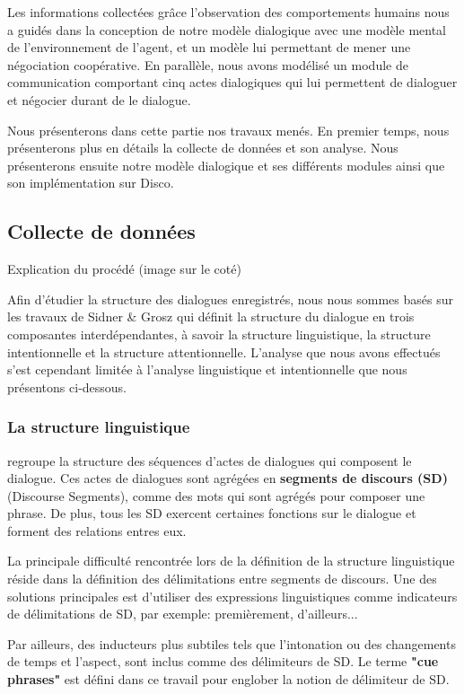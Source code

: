 \documentclass[a4paper,french]{article}
\begin{document}
\par Les informations collectées grâce l'observation des comportements humains nous a guidés dans la conception de notre modèle dialogique avec une modèle mental de l'environnement de l'agent, et un modèle lui permettant de mener une négociation coopérative. 
En parallèle, nous avons modélisé un module de communication comportant cinq actes dialogiques qui lui permettent de dialoguer et négocier durant de le dialogue. 
\par Nous présenterons dans cette partie nos travaux menés. En premier temps, nous présenterons plus en détails la collecte de données et son analyse. 
	Nous présenterons ensuite notre modèle dialogique et ses différents modules ainsi que son implémentation sur Disco. 
\subsection{Collecte de données}

Explication du procédé (image sur le coté)

Afin d'étudier la structure des dialogues enregistrés, nous nous sommes basés sur les travaux de Sidner \& Grosz \cite{grosz1986attention}  qui définit la structure du dialogue en trois composantes interdépendantes, à savoir la structure linguistique, la structure intentionnelle et la structure attentionnelle. L'analyse que nous avons effectués s'est cependant limitée à l'analyse linguistique et intentionnelle que nous présentons ci-dessous. 

\subsubsection{La structure linguistique} regroupe la structure des séquences d'actes de dialogues qui composent le dialogue. Ces actes de dialogues sont agrégées en \textbf{segments de discours (SD)} (Discourse Segments), comme des mots qui sont agrégés pour composer une phrase. De plus, tous les SD exercent certaines fonctions sur le dialogue et forment des relations entres eux.  
\par La principale difficulté rencontrée lors de la définition de la structure linguistique réside dans la définition des délimitations entre segments de discours. Une des solutions principales est d'utiliser des expressions linguistiques comme indicateurs de délimitations de SD, par exemple: premièrement, d'ailleurs... 
\par Par ailleurs, des inducteurs plus subtiles tels que l'intonation ou des changements de temps et l'aspect, sont inclus comme des délimiteurs de SD. Le terme \textbf{"cue phrases"} est défini dans ce travail pour englober la notion de délimiteur de SD. 
\end{document}
